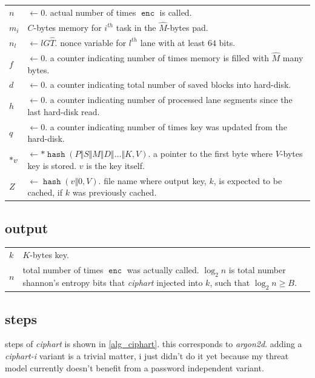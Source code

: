 \documentclass[twocolumn]{article}
\DeclareMathOperator{\enc}{\mathtt{enc}}
\DeclareMathOperator{\hash}{\mathtt{hash}}
\begin{document}
\begin{tabularx}{\columnwidth}{lX}
    $n$    & $\gets 0$.  actual number of times $\enc$ is called.\\
    $m_i$       & $C$-bytes memory for $i^{th}$ task in the $\hat M$-bytes
                    pad.\\
    $n_l$       & $\gets lG\hat T$.  nonce variable for $l^{th}$ lane with
                    at least $64$ bits.\\
    $f$         & $\gets 0$.  a counter indicating number of times
                    memory is filled with $\hat M$ many bytes.\\
    $d$         & $\gets 0$.  a counter indicating total number of saved
                    blocks into hard-disk.\\
    $h$         & $\gets 0$.  a counter indicating number of processed lane
                    segments since the last hard-disk read.\\
    $q$         & $\gets 0$.  a counter indicating number of times key was
                    updated from the hard-disk.\\
    $*v$         & $\gets *\hash(P \Vert S \Vert M \Vert D \Vert \ldots
                    \Vert K, V)$.  a pointer to the first byte where
                    $V$-bytes key is stored.  $v$ is the key itself.\\
    $Z$         & $\gets \hash(v \Vert 0, V)$.  file name where output key,
                    $k$, is expected to be cached, if $k$ was previously
                    cached.\\
\end{tabularx}

\subsection{output}
\begin{tabularx}{\columnwidth}{lX}
$k$ & $K$-bytes key.\\
$n$ & total number of times $\enc$ was actually called.  $\log_2 n$ is
        total number shannon's entropy bits that \emph{ciphart} injected
        into $k$, such that $\log_2 n \ge B$.\\
\end{tabularx}

\subsection{steps}
steps of \emph{ciphart} is shown in \cref{alg_ciphart}.  this corresponds
to \emph{argon2d}.  adding a \emph{ciphart-i} variant is a trivial matter,
i just didn't do it yet because my threat model currently doesn't benefit
from a password independent variant.
\end{document}
